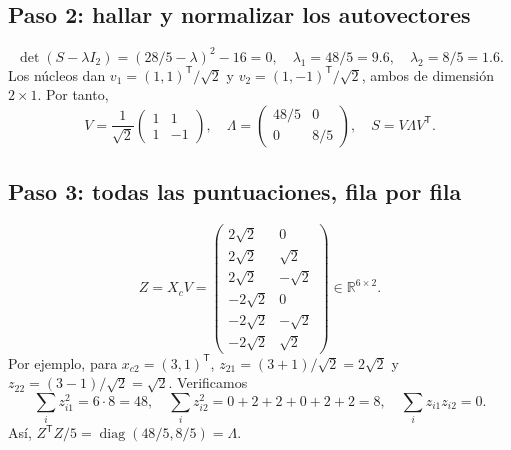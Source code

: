 \documentclass[11pt,a4paper]{article}
\newcommand{\R}{\mathbb R}
\newcommand{\T}{^{\mathsf T}}
\DeclareMathOperator{\diag}{diag}
\theoremstyle{definition}
\begin{document}
\subsection{Paso 2: hallar y normalizar los autovectores}
\[
\det(S-\lambda I_2)=(28/5-\lambda)^2-16=0,
\quad\lambda_1=48/5=9.6,\quad\lambda_2=8/5=1.6.
\]
Los núcleos dan $v_1=(1,1)\T/\sqrt2$ y $v_2=(1,-1)\T/\sqrt2$, ambos de dimensión $2\times1$. Por tanto,
\[
V=\frac1{\sqrt2}\begin{pmatrix}1&1\\1&-1\end{pmatrix},\quad
\Lambda=\begin{pmatrix}48/5&0\\0&8/5\end{pmatrix},\quad S=V\Lambda V\T.
\]
\subsection{Paso 3: todas las puntuaciones, fila por fila}
\[
Z=X_cV=\begin{pmatrix}2\sqrt2&0\\2\sqrt2&\sqrt2\\2\sqrt2&-\sqrt2\\-2\sqrt2&0\\-2\sqrt2&-\sqrt2\\-2\sqrt2&\sqrt2\end{pmatrix}\in\R^{6\times2}.
\]
Por ejemplo, para $x_{c2}=(3,1)\T$, $z_{21}=(3+1)/\sqrt2=2\sqrt2$ y $z_{22}=(3-1)/\sqrt2=\sqrt2$. Verificamos
\[
\sum_i z_{i1}^2=6\cdot8=48,\quad \sum_i z_{i2}^2=0+2+2+0+2+2=8,\quad
\sum_i z_{i1}z_{i2}=0.
\]
Así, $Z\T Z/5=\diag(48/5,8/5)=\Lambda$.
\end{document}
